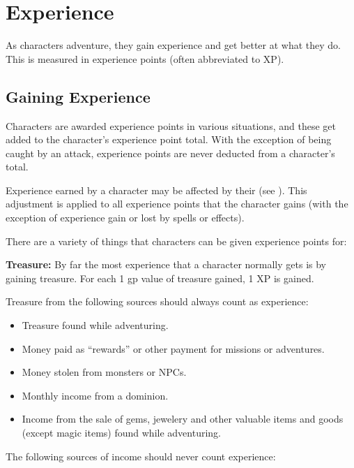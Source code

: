 \chapter[green]{Experience}
\label{chap:Experience}
\thispagestyle{plain}

\begin{multicols*}{2}
As characters adventure, they gain experience and get better at what they do. This is measured in experience points (often abbreviated to XP).

\section{Gaining Experience}\label{sec:Gaining Experience}
Characters are awarded experience points in various situations, and these get added to the character’s experience point total. With the exception of being caught by an  attack, experience points are never deducted from a character’s total.

Experience earned by a character may be affected by their  (see ). This adjustment is applied to all experience points that the character gains (with the exception of experience gain or lost by spells or effects).

There are a variety of things that characters can be given experience points for:

\textbf{Treasure:} By far the most experience that a character normally gets is by gaining treasure. For each 1 gp value of treasure gained, 1 XP is gained.

Treasure from the following sources should always count as experience:

\begin{itemize}
	\item{Treasure found while adventuring.}
	\item{Money paid as “rewards” or other payment for missions or adventures.}
	\item{Money stolen from monsters or NPCs.}
	\item{Monthly income from a dominion.}
	\item{Income from the sale of gems, jewelery and other valuable items and goods (except magic items) found while adventuring.}
\end{itemize}

The following sources of income should never count experience:


\end{multicols*}
